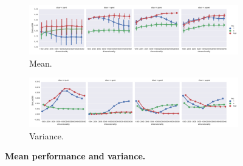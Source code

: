 \begin{figure}
  \centering
  \begin{subfigure}[b]{\textwidth}
    \includegraphics[width=\textwidth]{supplement/figures/SimLex999-performance-mean}
  \caption{Mean.}
  \label{fig:performance-mean}
  \end{subfigure}

  \begin{subfigure}[b]{\textwidth}
    \includegraphics[width=\textwidth]{supplement/figures/SimLex999-performance-var}
  \caption{Variance.}
  \label{fig:performance-var}
  \end{subfigure}

  \caption{\textbf{Mean performance and variance.}}
  \label{fig:performance-mean-var}

\end{figure}


